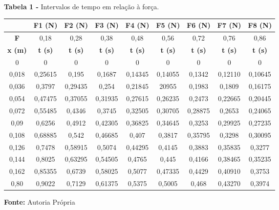 \documentclass[article,12pt,oneside,a4paper,brazil]{abntex2}
\begin{document}
	\begin{table}[h!]
		\centering
		\begin{adjustwidth}{0cm}{0cm}
			\begin{flushleft}
				\textbf{Tabela 1 -} Intervalos de tempo em relação à força.
			\end{flushleft}
		\end{adjustwidth}
	
		\label{tab:intervalos-forca}
		\begin{tabular}{|c|c|c|c|c|c|c|c|c|}
			\hline
			& \textbf{F1 (N)} & \textbf{F2 (N)} & \textbf{F3 (N)} & \textbf{F4 (N)} & \textbf{F5 (N)} & \textbf{F6 (N)} & \textbf{F7 (N)} & \textbf{F8 (N)} \\ \hline
			\textbf{F } & 0,18 & 0,28 & 0,38 & 0,48 & 0,56 & 0,72 & 0,76 & 0,86 \\ \hline
			\textbf{x (m)} & \textbf{t (s)} & \textbf{t (s)} & \textbf{t (s)} & \textbf{t (s)} & \textbf{t (s)} & \textbf{t (s)} & \textbf{t (s)} & \textbf{t (s)} \\ \hline
			0 & 0 & 0 & 0 & 0 & 0 & 0 & 0 & 0 \\ \hline
			0,018 & 0,25615 & 0,195 & 0,1687 & 0,14345 & 0,14055 & 0,1342 & 0,12110 & 0,10645 \\ \hline
			0,036 & 0,3797 & 0,29435 & 0,254 & 0,21845 & 20955 & 0,1983 & 0,1809 & 0,16175 \\ \hline
			0,054 & 0,47475 & 0,37055 & 0,31935 & 0,27615 & 0,26235 & 0,2473 & 0,22665 & 0,20445 \\ \hline
			0,072 & 0,55485 & 0,4346 & 0,3745 & 0,32505 & 0,30705 & 0,28875 & 0,2653 & 0,24065 \\ \hline
			0,09 & 0,6256 & 0,4912 & 0,42305 & 0,36825 & 0,34645 & 0,3253 & 0,29925 & 0,27235 \\ \hline
			0,108 & 0,68885 & 0,542 & 0,46685 & 0,407 & 0,3817 & 0,35795 & 0,3298 & 0,30095 \\ \hline
			0,126 & 0,7478 & 0,58915 & 0,5074 & 0,44295 & 0,4145 & 0,3883 & 0,35835 & 0,3277 \\ \hline
			0,144 & 0,8025 & 0,63295 & 0,54505 & 0,4765 & 0,445 & 0,4166 & 0,38465 & 0,35235 \\ \hline
			0,162 & 0,85355 & 0,6739 & 0,58025 & 0,5077 & 0,47335 & 0,4429 & 0,40910 & 0,3753 \\ \hline
			0,80 & 0,9022 & 0,7129 & 0,61375 & 0,5375 & 0,5005 & 0,468 & 0,43270 & 0,3974 \\ \hline
		\end{tabular}
		
		\begin{adjustwidth}{0cm}{0cm}
			\begin{flushleft}
				\textbf{Fonte: }Autoria Própria
			\end{flushleft}
		\end{adjustwidth}
	\end{table}
\end{document}
